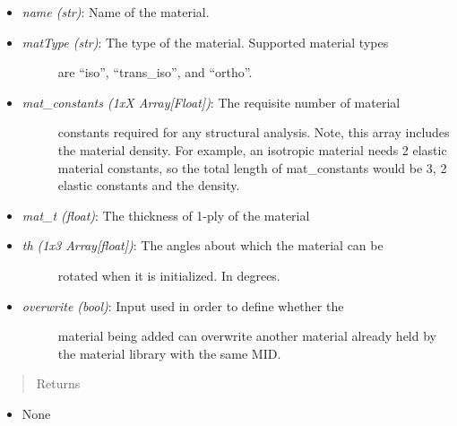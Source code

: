 \documentclass[letterpaper,10pt,english]{sphinxmanual}
\begin{document}
\begin{fulllineitems}
\begin{fulllineitems}
\begin{itemize}
\item {} 
\emph{name (str)}: Name of the material.

\item {} \begin{description}
\item[{\emph{matType (str)}: The type of the material. Supported material types}] \leavevmode
are ``iso'', ``trans\_iso'', and ``ortho''.

\end{description}

\item {} \begin{description}
\item[{\emph{mat\_constants (1xX Array{[}Float{]})}: The requisite number of material}] \leavevmode
constants required for any structural analysis. Note, this
array includes the material density. For example, an isotropic
material needs 2 elastic material constants, so the total
length of mat\_constants would be 3, 2 elastic constants and the
density.

\end{description}

\item {} 
\emph{mat\_t (float)}: The thickness of 1-ply of the material

\item {} \begin{description}
\item[{\emph{th (1x3 Array{[}float{]})}: The angles about which the material can be}] \leavevmode
rotated when it is initialized. In degrees.

\end{description}

\item {} \begin{description}
\item[{\emph{overwrite (bool)}: Input used in order to define whether the}] \leavevmode
material being added can overwrite another material already
held by the material library with the same MID.

\end{description}

\end{itemize}
\begin{quote}\begin{description}
\item[{Returns}] \leavevmode
\end{description}\end{quote}
\begin{itemize}
\item {} 
None


\end{itemize}
\end{fulllineitems}
\end{fulllineitems}
\end{document}
